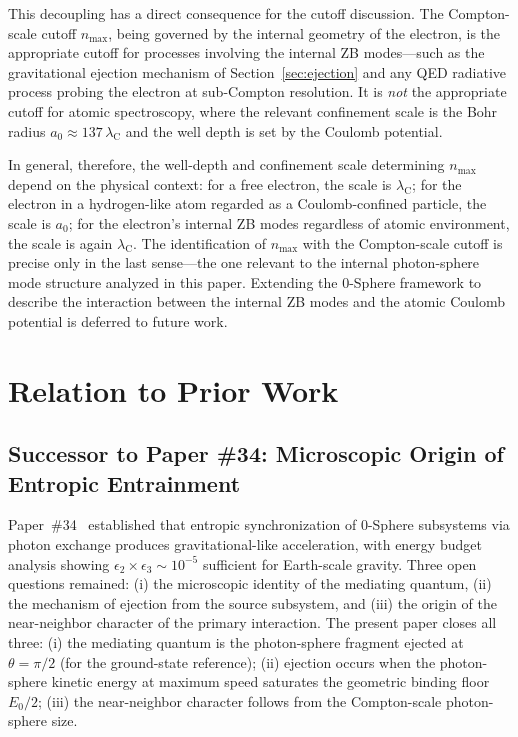 \documentclass[%
 reprint, amsmath,amssymb, aps, prb, ]{revtex4-2}
\numberwithin{equation}{section}
\newcommand{\lambdaC}{\lambda_{\mathrm{C}}}
\begin{document}
This decoupling has a direct consequence for the cutoff discussion. The Compton-scale cutoff $n_{\max}$, being governed by the internal geometry of the electron, is the appropriate cutoff for processes involving the internal ZB modes---such as the gravitational ejection mechanism of Section~\ref{sec:ejection} and any QED radiative process probing the electron at sub-Compton resolution. It is \emph{not} the appropriate cutoff for atomic spectroscopy, where the relevant confinement scale is the Bohr radius $a_0 \approx 137\,\lambdaC$ and the well depth is set by the Coulomb potential.

In general, therefore, the well-depth and confinement scale determining $n_{\max}$ depend on the physical context: for a free electron, the scale is $\lambdaC$; for the electron in a hydrogen-like atom regarded as a Coulomb-confined particle, the scale is $a_0$; for the electron's internal ZB modes regardless of atomic environment, the scale is again $\lambdaC$. The identification of $n_{\max}$ with the Compton-scale cutoff is precise only in the last sense---the one relevant to the internal photon-sphere mode structure analyzed in this paper. Extending the 0-Sphere framework to describe the interaction between the internal ZB modes and the atomic Coulomb potential is deferred to future work.

\section{Relation to Prior Work}
\label{sec:prior}

\subsection{Successor to Paper \#34: Microscopic Origin of Entropic Entrainment}
\label{sec:prior_34}

Paper~\#34~\cite{hanamura34} established that entropic synchronization of 0-Sphere subsystems via photon exchange produces gravitational-like acceleration, with energy budget analysis showing $\epsilon_2 \times \epsilon_3 \sim 10^{-5}$ sufficient for Earth-scale gravity. Three open questions remained: (i) the microscopic identity of the mediating quantum, (ii) the mechanism of ejection from the source subsystem, and (iii) the origin of the near-neighbor character of the primary interaction. The present paper closes all three: (i) the mediating quantum is the photon-sphere fragment ejected at $\theta = \pi/2$ (for the ground-state reference); (ii) ejection occurs when the photon-sphere kinetic energy at maximum speed saturates the geometric binding floor $E_0/2$; (iii) the near-neighbor character follows from the Compton-scale photon-sphere size.
\end{document}
